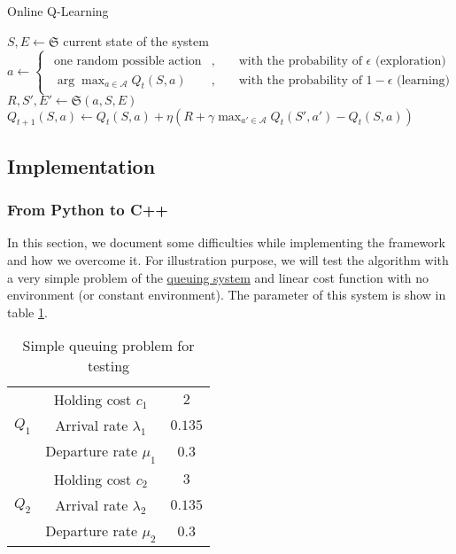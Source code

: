 \documentclass[
  a4paper, xcolor = usenames,dvipsnames]{article}
\begin{document}
\begin{algorithm}
\caption{Online Q-Learning}\label{alg:on-q-learning}
 {
  $S, E \gets \mathfrak{S}$ current state of the system\;
  $a \gets 
    \begin{cases}
    \begin{aligned}
      \text{one random possible action}&, && \text{ with the probability of } \epsilon \text{ (exploration)}\\ 
      \arg\max_{a \in \mathcal{A}} Q_{t}(S, a)&, && \text{ with the probability of } 1 - \epsilon \text{ (learning)}
    \end{aligned}
    \end{cases}
  $\\
  $R, S', E' \gets \mathfrak{S}(a, S, E)$\;
  $Q_{t+1}(S, a) \gets Q_{t}(S, a) + \eta (R + \gamma \max_{a' \in \mathcal{A}} Q_{t}(S', a') - Q_{t}(S, a))$ \;
}
\end{algorithm}

\hypertarget{implementation}{%
\subsection{Implementation}\label{implementation}}

\hypertarget{from-python-to-c}{%
\subsubsection{From Python to C++}\label{from-python-to-c}}

In this section, we document some difficulties while implementing the framework and how we overcome it. For illustration purpose, we will test the algorithm with a very simple problem of the \protect\hyperlink{queuing-system}{queuing system}
and linear cost function with no environment (or constant environment). The parameter of this system is show in table \ref{tab:q-learning-test}.

\begin{table}[ht]
\caption{Simple queuing problem for testing}
\begin{center}
\begin{tabular}{c c c}
    \hline
    \multirow{3}{*}{$Q_{1}$} & Holding cost $c_{1}$ & $2$ \\
    & Arrival rate $\lambda_{1}$ & $0.135$ \\
    & Departure rate $\mu_{1}$ & $0.3$ \\
    \cline{2-3}
    \multirow{3}{*}{$Q_{2}$} & Holding cost $c_{2}$ & $3$ \\
    & Arrival rate $\lambda_{2}$ & $0.135$ \\
    & Departure rate $\mu_{2}$ & $0.3$ \\    
    \hline
\end{tabular}
\end{center}
\label{tab:q-learning-test}
\end{table}
\end{document}

